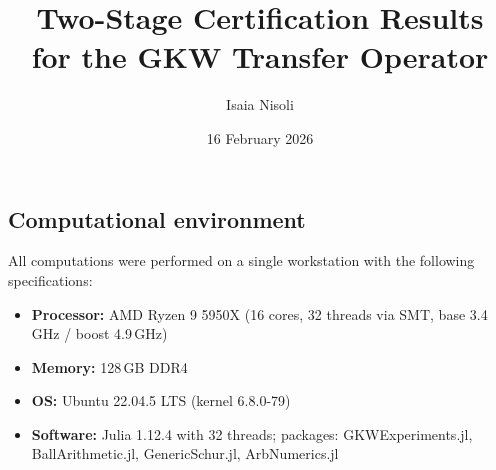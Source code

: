 \documentclass[11pt]{article}
\title{Two-Stage Certification Results\\for the GKW Transfer Operator}
\author{Isaia Nisoli}
\date{16 February 2026}
\begin{document}
\maketitle


\subsection*{Computational environment}

All computations were performed on a single workstation with the following specifications:
\begin{itemize}
\item \textbf{Processor:} AMD Ryzen 9 5950X (16 cores, 32 threads via SMT, base 3.4\,GHz / boost 4.9\,GHz)
\item \textbf{Memory:} 128\,GB DDR4
\item \textbf{OS:} Ubuntu 22.04.5 LTS (kernel 6.8.0-79)
\item \textbf{Software:} Julia 1.12.4 with 32 threads; packages: GKWExperiments.jl, BallArithmetic.jl, GenericSchur.jl, ArbNumerics.jl
\end{itemize}
\end{document}
